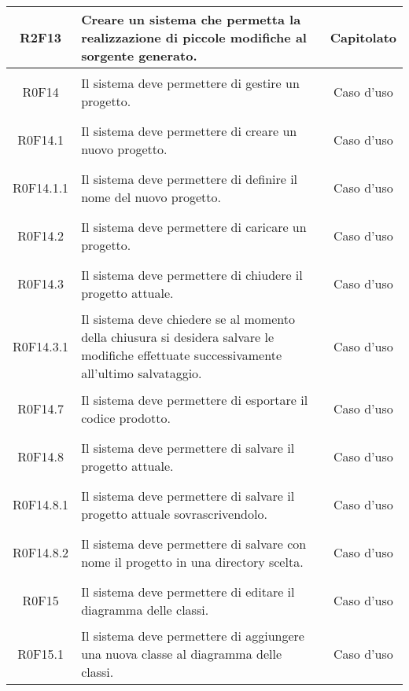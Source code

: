 \documentclass[../AnalisiDeiRequisiti.tex]{subfiles}
\begin{document}
\begin{longtable}{|c|>{\centering}p{7cm}|c|}
	\hypertarget{R2F13}{R2F13} & Creare un sistema che permetta la realizzazione di piccole modifiche al sorgente generato. & Capitolato \\ \hline
	\hypertarget{R0F14}{R0F14} & Il sistema deve permettere di gestire un progetto. & Caso d'uso \\ \hline
	\hypertarget{R0F14.1}{R0F14.1} & Il sistema deve permettere di creare un nuovo progetto. & Caso d'uso \\ \hline
	\hypertarget{R0F14.1.1}{R0F14.1.1} & Il sistema deve permettere di definire il nome del nuovo progetto. & Caso d'uso \\ \hline
	\hypertarget{R0F14.2}{R0F14.2} & Il sistema deve permettere di caricare un progetto.

& Caso d'uso \\ \hline
\hypertarget{R0F14.3}{R0F14.3} & Il sistema deve permettere di chiudere il progetto attuale. & Caso d'uso \\ \hline
\hypertarget{R0F14.3.1}{R0F14.3.1} & Il sistema deve chiedere se al momento della chiusura si desidera  salvare le modifiche effettuate successivamente all'ultimo salvataggio. & Caso d'uso \\ \hline
\hypertarget{R0F14.7}{R0F14.7} & Il sistema deve permettere di esportare il codice prodotto. & Caso d'uso \\ \hline
\hypertarget{R0F14.8}{R0F14.8} & Il sistema deve permettere di salvare il progetto attuale. & Caso d'uso \\ \hline
\hypertarget{R0F14.8.1}{R0F14.8.1} & Il sistema deve permettere di salvare il progetto attuale sovrascrivendolo. & Caso d'uso \\ \hline
\hypertarget{R0F14.8.2}{R0F14.8.2} & Il sistema deve permettere di salvare con nome il progetto in una directory scelta. & Caso d'uso \\ \hline
\hypertarget{R0F15}{R0F15} & Il sistema deve permettere di editare il diagramma delle classi. & Caso d'uso \\ \hline
\hypertarget{R0F15.1}{R0F15.1} & Il sistema deve permettere di aggiungere una nuova classe al diagramma delle classi. & Caso d'uso \\ \hline

\end{longtable}
\end{document}
